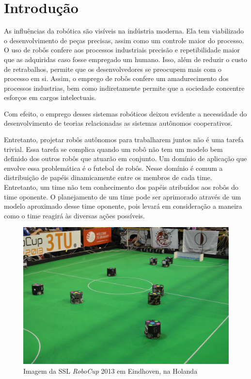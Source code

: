 \chapter{Introdução}


As influências da robótica
são visíveis na indústria moderna. Ela tem viabilizado o desenvolvimento de peças
precisas, assim como um controle maior do processo. O uso de robôs confere aos
processos industriais precisão e repetibilidade maior que as adquiridas caso
fosse empregado um humano. Isso, além de reduzir o custo de retrabalhos, permite
que os desenvolvedores se preocupem mais com o processo em si. Assim, o emprego
de robôs confere um amadurecimento dos processos industrias, bem como indiretamente
permite que a sociedade concentre esforços em cargos intelectuais.

Com efeito, o emprego desses sistemas robóticos deixou evidente a necessidade do
desenvolvimento de teorias relacionadas as sistemas autônomos cooperativos. 


Entretanto, projetar robôs autônomos para trabalharem juntos não é uma tarefa trivial. Essa
tarefa se complica quando um robô não tem um modelo bem definido dos outros robôs que atuarão em
conjunto. Um domínio de aplicação que envolve essa problemática é o futebol de robôs.
Nesse domínio é comum a distribuição de papéis dinamicamente entre os membros de cada
time. Entretanto, um time não tem conhecimento dos papéis atribuídos aos robôs
do time oponente. O planejamento de um time pode ser aprimorado através de um modelo
aproximado desse time oponente, pois levará em consideração a maneira como o
time reagirá às diversas ações possíveis.

\begin{figure}
  \includegraphics[width = \linewidth]{figuras/robocup2013}
  \caption{Imagem da SSL \textit{RoboCup} 2013 em Eindhoven, na Holanda}\label{fig:robocup2013}
\end{figure}

